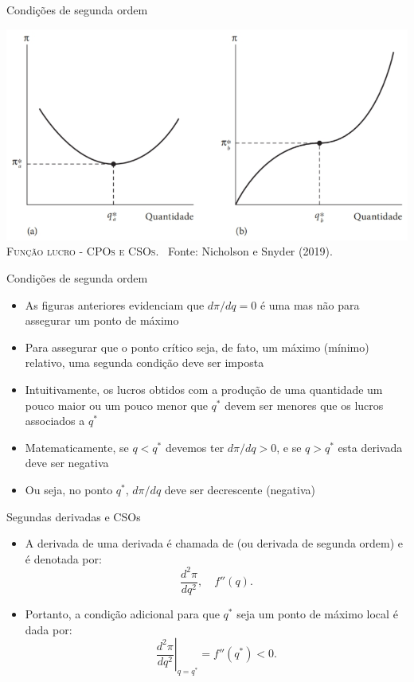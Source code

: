 \documentclass[10pt]{beamer}
\begin{document}
\begin{frame}
    {Condições de segunda ordem}
    \begin{center}
		\begin{minipage}[b]{.8\textwidth}
			\includegraphics[width=\textwidth]{./figures/aula2_cso.PNG}\\
			\tiny{{\scshape Função lucro - CPOs e CSOs}. \ Fonte: Nicholson e Snyder (2019).}
            \label{aula2_fig2}
		\end{minipage}
	\end{center}
\end{frame}

\begin{frame}
    {Condições de segunda ordem}
    \begin{itemize}
        \item As figuras anteriores evidenciam que $d\pi/d q = 0$ é uma  mas não  para assegurar um ponto de máximo\bigskip
        \item Para assegurar que o ponto crítico seja, de fato, um máximo (mínimo) relativo, uma segunda condição deve ser imposta\bigskip        
        \item Intuitivamente, os lucros obtidos com a produção de uma quantidade um pouco maior ou um pouco menor que $q^*$ devem ser menores que os lucros associados a $q^*$\bigskip
        \item Matematicamente, se $q < q^*$ devemos ter $d\pi/d q > 0$, e se $q > q^*$ esta derivada deve ser negativa\bigskip
        \item Ou seja, no ponto $q^*$, $d\pi/d q$ deve ser decrescente (negativa)
    \end{itemize}
\end{frame}

\begin{frame}
    {Segundas derivadas e CSOs}
    \begin{itemize}
        \item A derivada de uma derivada é chamada de  (ou derivada de segunda ordem) e é denotada por:
        \[
          \frac{d^2 \pi}{d q^2}, \quad f''(q).  
        \]\bigskip
        \item Portanto, a condição adicional para que $q^*$ seja um ponto de máximo local é dada por:
        \[
          \left. \frac{d^2\pi}{d q^2}\right|_{q = q^*} = f''(q^*) < 0.  
        \]
    \end{itemize}
\end{frame}
\end{document}
